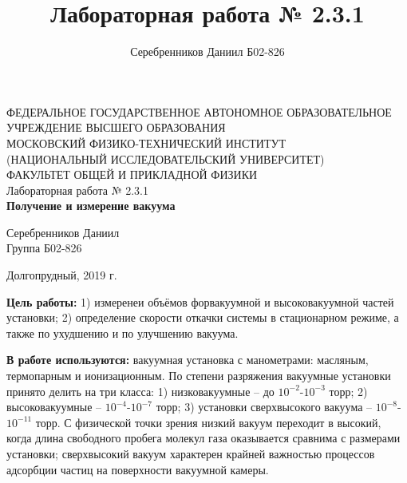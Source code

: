 \documentclass[a4paper,12pt]{article} %
\author{Серебренников Даниил Б02-826}
\title{Лабораторная работа № 2.3.1}
\begin{document}
\begin{center}
\footnotesize{ФЕДЕРАЛЬНОЕ ГОСУДАРСТВЕННОЕ АВТОНОМНОЕ ОБРАЗОВАТЕЛЬНОЕ 			УЧРЕЖДЕНИЕ ВЫСШЕГО ОБРАЗОВАНИЯ}\\
\footnotesize{МОСКОВСКИЙ ФИЗИКО-ТЕХНИЧЕСКИЙ ИНСТИТУТ\\(НАЦИОНАЛЬНЫЙ 			ИССЛЕДОВАТЕЛЬСКИЙ УНИВЕРСИТЕТ)}\\
\footnotesize{ФАКУЛЬТЕТ ОБЩЕЙ И ПРИКЛАДНОЙ ФИЗИКИ\\}
\hfill \break
\hfill\break
\hfill\break
\hfill \break
\hfill \break
\hfill \break
\hfill \break
\hfill \break
\hfill \break
\hfill \break
\hfill \break
\hfill \break
\hfill \break
\hfill \break
\hfill \break
\large{Лабораторная работа № 2.3.1\\\textbf{Получение и измерение вакуума}}\\
\hfill \break
\hfill \break
\hfill \break
\begin{flushright}
	Серебренников Даниил\\
	Группа Б02-826
\end{flushright}
\hfill \break
\hfill \break
\hfill \break
\hfill \break
\hfill \break
\end{center}
\hfill \break
\hfill \break
\hfill \break
\hfill \break
\hfill \break
\hfill \break
\begin{center}
	Долгопрудный, 2019 г.
\end{center}
\thispagestyle{empty} %


\newpage
\textbf{Цель работы:} 1) измеренеи объёмов форвакуумной и высоковакуумной частей установки; 2) определение скорости откачки системы в стационарном режиме, а также по ухудшению и по улучшению вакуума.

\textbf{В работе используются:} вакуумная установка с манометрами: масляным, термопарным и ионизационным.
	По степени разряжения вакуумные установки принято делить на три класса: 1) низковакуумные -- до $10^{-2}$-$10^{-3}$ торр; 2) высоковакуумные -- $10^{-4}$-$10^{-7}$ торр; 3) установки сверхвысокого вакуума -- $10^{-8}$-$10^{-11}$ торр. С физической точки зрения низкий вакуум переходит в высокий, когда длина свободного пробега молекул газа оказывается сравнима с размерами установки; сверхвысокий вакуум характерен крайней важностью процессов адсорбции частиц на поверхности вакуумной камеры.

\end{document}
